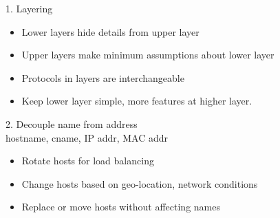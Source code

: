 \begin{frame}[plain]
\end{frame}

\begin{cf}
	1. Layering
\end{cf}




\begin{cf}{\small
	\begin{itemize}
	\item Lower layers hide details from upper layer
	\item Upper layers make minimum assumptions about lower layer
	\item Protocols in layers are interchangeable
	\item Keep lower layer simple, more features at higher layer.
	\end{itemize}
}
\end{cf}

\begin{cf}
	2. Decouple name from address\\
	\vspace{1cm}
	hostname, cname, IP addr, MAC addr
\end{cf}

\begin{cf}{\small
	\begin{itemize}
	\item Rotate hosts for load balancing
	\item Change hosts based on geo-location, network conditions
  \item Replace or move hosts without affecting names
	\end{itemize}
}
\end{cf}

